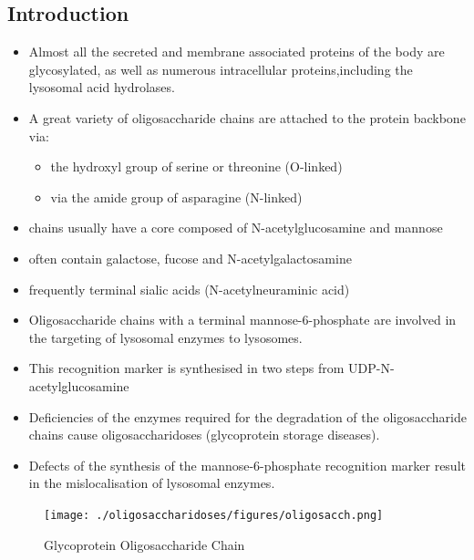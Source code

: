 \documentclass{scrartcl}
\begin{document}
\subsection{Introduction}
\label{sec:orgdbd27c0}

\begin{itemize}
\item Almost all the secreted and membrane associated proteins of the body
are glycosylated, as well as numerous intracellular
proteins,including the lysosomal acid hydrolases.
\item A great variety of oligosaccharide chains are attached to the
protein backbone via:
\begin{itemize}
\item the hydroxyl group of serine or threonine (O-linked)
\item via the amide group of asparagine (N-linked)
\end{itemize}

\item chains usually have a core composed of N-acetylglucosamine and mannose
\item often contain galactose, fucose and N-acetylgalactosamine
\item frequently terminal sialic acids (N-acetylneuraminic acid)
\item Oligosaccharide chains with a terminal mannose-6-phosphate are
involved in the targeting of lysosomal enzymes to lysosomes.
\item This recognition marker is synthesised in two steps from UDP-N-acetylglucosamine

\item Deficiencies of the enzymes required for the degradation of the
oligosaccharide chains cause oligosaccharidoses (glycoprotein storage diseases).

\item Defects of the synthesis of the mannose-6-phosphate recognition
marker result in the mislocalisation of lysosomal enzymes.
\end{itemize}


\begin{figure}[htbp]
\centering
\texttt{[image: ./oligosaccharidoses/figures/oligosacch.png]}
\caption{\label{fig:org6dd99e2}
Glycoprotein Oligosaccharide Chain}
\end{figure}
\end{document}
